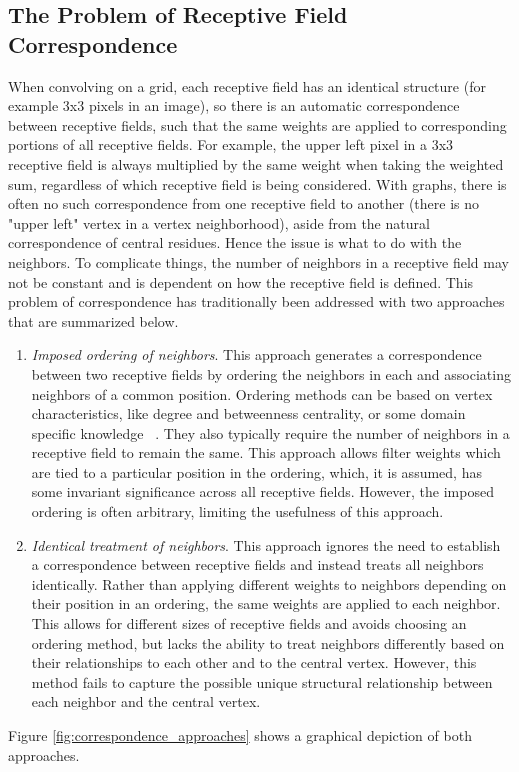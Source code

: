 \subsection{The Problem of Receptive Field Correspondence}
When convolving on a grid, each receptive field has an identical structure (for example 3x3 pixels in an image), so there is an automatic correspondence between receptive fields, such  that the same weights are applied to corresponding portions of all receptive fields. 
For example, the upper left pixel in a 3x3 receptive field is always multiplied by the same weight when taking the weighted sum, regardless of which receptive field is being considered.
With graphs, there is often no such correspondence from one receptive field to another (there is no "upper left" vertex in a vertex neighborhood), aside from the natural correspondence of central residues. Hence the issue is what to do with the neighbors. To complicate things, the number of neighbors in a receptive field may not be constant and is dependent on how the receptive field is defined.
This problem of correspondence has traditionally been addressed with two approaches that are summarized below. 
\begin{enumerate}
	\item \textit{Imposed ordering of neighbors}. This approach generates a correspondence between two receptive fields by ordering the neighbors in each and associating neighbors of a common position. 
	Ordering methods can be based on vertex characteristics, like degree and betweenness centrality, or some domain specific knowledge ~\cite{niepert2016, duvenaud2015}.
	They also typically require the number of neighbors in a receptive field to remain the same.
	This approach allows filter weights which are tied to a particular position in the ordering, which, it is assumed, has some invariant significance across all receptive fields.
	However, the imposed ordering is often arbitrary, limiting the usefulness of this approach.
	
	\item \textit{Identical treatment of neighbors}. This approach ignores the need to establish a correspondence between receptive fields and instead treats all neighbors identically.
	Rather than applying different weights to neighbors depending on their position in an ordering, the same weights are applied to each neighbor.
	This allows for different sizes of receptive fields and avoids choosing an ordering method, but lacks the ability to treat neighbors differently based on their relationships to each other and to the central vertex.
	However, this method fails to capture the possible unique structural relationship between each neighbor and the central vertex.
\end{enumerate}
Figure \ref{fig:correspondence_approaches} shows a graphical depiction of both approaches.

